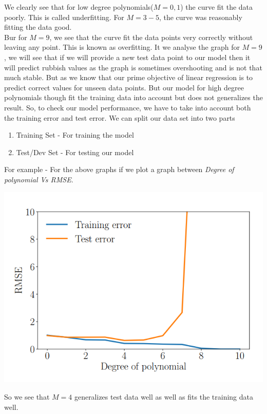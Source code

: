 \documentclass[12pt]{article}
\numberwithin{equation}{section}
\begin{document}
{We clearly see that for low degree polynomials($M= 0, 1$) the curve fit the data poorly. This is called underfitting. For $M= 3-5$, the curve was reasonably fitting the data good.\\
Bur for $M= 9$, we see that the curve fit the data points very correctly without leaving any point. This is known as overfitting. It we analyse the graph for $M= 9$, we will see that if we will provide a new test data point to our model then it will predict rubbish values as the graph is sometimes overshooting and is not that much stable. But as we know that our prime objective of linear regression is to predict correct values for unseen data points. But our model for high degree polynomials though fit the training data into account but does not generalizes the result. So, to check our model performance, we have to take into account both the training error and test error. We can split our data set into two parts
\begin{enumerate}
	\item Training Set - For training the model
	\item Test/Dev Set - For testing our model
\end{enumerate}
For example -  For the above graphs if we plot a graph between \textit{Degree of polynomial Vs RMSE}.
\begin{center}
\includegraphics[width=\columnwidth/2]{graph11}
\end{center}
So we see that $M=4$ generalizes test data well as well as fits the training data well.

}
\end{document}
